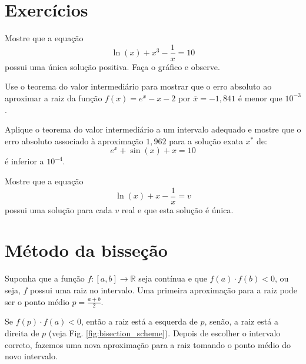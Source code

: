 \section*{Exercícios}

\begin{Exercise}Mostre que a equação
  \begin{equation*}
    \ln(x)+x^3-\frac{1}{x}=10  
  \end{equation*}
possui uma única solução positiva. Faça o gráfico e observe.
\end{Exercise}

\begin{Exercise} Use o teorema do valor intermediário para mostrar que o erro absoluto ao aproximar a raiz da função $f(x)=e^x-x-2$ por $\overline{x}=-1,841$ é menor que $10^{-3}$.
\end{Exercise}

\begin{Exercise} Aplique o teorema do valor intermediário a um intervalo adequado e mostre que o erro absoluto associado à aproximação $1,962$ para a solução  exata $x^*$ de:
  \begin{equation*}
    e^x+\sin (x) +x = 10  
  \end{equation*}
é inferior a $10^{-4}$.
\end{Exercise}

\begin{Exercise}\label{existe_unica} Mostre que a equação
  \begin{equation*}
    \ln(x)+x-\frac{1}{x}=v
  \end{equation*}
possui uma solução para cada $v$ real e que esta solução é única.
\end{Exercise}


\section{Método da bisseção}

Suponha que a função $f:[a,b]\to\mathbb{R}$ seja contínua e que $f(a)\cdot f(b)<0$, ou seja, $f$ possui uma raiz no intervalo. Uma primeira aproximação para a raiz pode ser o ponto médio $p=\frac{a+b}{2}$.

Se $f(p)\cdot f(a)<0$, então a raiz está a esquerda de $p$, senão, a raiz está a direita de $p$ (veja Fig. \ref{fig:bisection_scheme}). Depois de escolher o intervalo correto, fazemos uma nova aproximação para a raiz tomando o ponto médio do novo intervalo.

